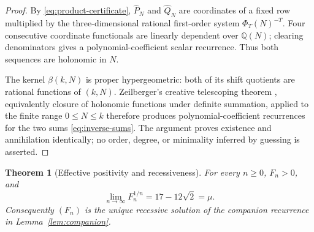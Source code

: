 \documentclass[11pt]{article}
\newtheorem{theorem}{Theorem}
\theoremstyle{remark}
\newcommand{\Q}{\mathbb Q}
\begin{document}
\begin{proof}
By \eqref{eq:product-certificate}, $\widehat P_N$ and
$\widehat Q_N$ are coordinates of a fixed row multiplied by the
three-dimensional rational first-order system $\Phi_T(N)^{-T}$.
Four consecutive coordinate functionals are linearly dependent over
$\Q(N)$; clearing denominators gives a polynomial-coefficient scalar
recurrence.  Thus both sequences are holonomic in $N$.

The kernel $\beta(k,N)$ is proper hypergeometric: both of its shift
quotients are rational functions of $(k,N)$.  Zeilberger's creative
telescoping theorem \cite{Zeilberger}, equivalently closure of holonomic functions
under definite summation, applied to the finite range $0\leq N\leq k$
therefore produces polynomial-coefficient recurrences for the two
sums \eqref{eq:inverse-sums}.  The argument proves existence and
annihilation identically; no order, degree, or minimality inferred by
guessing is asserted.
\end{proof}

\begin{theorem}[Effective positivity and recessiveness]\label{thm:positive-recessive}
For every $n\geq0$, $F_n>0$, and
\begin{equation}\label{eq:Fn-rate}
             \lim_{n\to\infty}F_n^{1/n}=17-12\sqrt2=\mu.
\end{equation}
Consequently $(F_n)$ is the unique recessive solution of the
companion recurrence in Lemma~\ref{lem:companion}.
\end{theorem}
\end{document}
